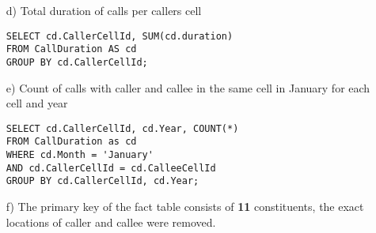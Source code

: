 \documentclass{scrartcl}
\begin{document}
\begin{itemize}
\item[d)] Total duration of calls per callers cell

\begin{lstlisting}
SELECT cd.CallerCellId, SUM(cd.duration) 
FROM CallDuration AS cd 
GROUP BY cd.CallerCellId;
\end{lstlisting}

\item[e)] Count of calls with caller and callee in the same cell in January for
each cell and year
\begin{lstlisting}
SELECT cd.CallerCellId, cd.Year, COUNT(*)
FROM CallDuration as cd
WHERE cd.Month = 'January'
AND cd.CallerCellId = cd.CalleeCellId
GROUP BY cd.CallerCellId, cd.Year;
\end{lstlisting}

\item[f)] The primary key of the fact table consists of \textbf{11} constituents, the exact locations of caller and callee were removed.

\end{itemize}
\end{document}
